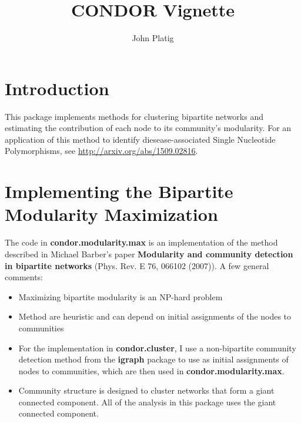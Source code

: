 \documentclass{article}
\title{CONDOR Vignette}
\author{John Platig}
\begin{document}

\maketitle

\section{Introduction}
This package implements methods for clustering bipartite networks and estimating the contribution of each node to its community's modularity. For an application of this method to identify diesease-associated Single Nucleotide Polymorphisms, see \url{http://arxiv.org/abs/1509.02816}.

\section{Implementing the Bipartite Modularity Maximization}
The code in \textbf{condor.modularity.max} is an implementation of the method described in Michael Barber's paper \textbf{Modularity and community detection in bipartite networks} (Phys. Rev. E 76, 066102 (2007)). A few general comments:
\begin{itemize}
\item Maximizing bipartite modularity is an NP-hard problem
\item Method are heuristic and can depend on initial assignments of the nodes to communities
\item For the implementation in \textbf{condor.cluster}, I use a non-bipartite community detection method from the \textbf{igraph} package to use as initial assignments of nodes to communities, which are then used in \textbf{condor.modularity.max}.
\item Community structure is designed to cluster networks that form a giant connected component. All of the analysis in this package uses the giant connected component.
\end{itemize}
\end{document}
